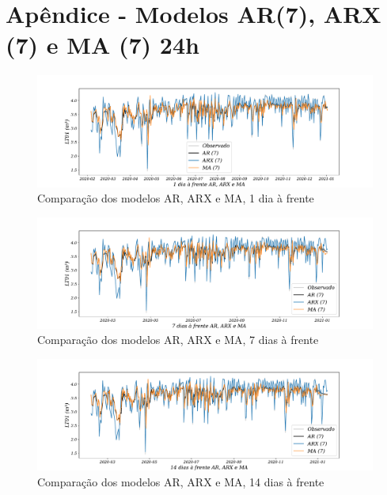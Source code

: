 
\section{Ap\^endice - Modelos AR(7), ARX (7) e MA (7) 24h }\label{sec:ararxma24}

\begin{figure}[H]
	\centering
	\caption{Comparação dos modelos AR, ARX e MA, 1 dia à frente }
	\label{fig:1-AR-ARX-MA24}
	\includegraphics[width=1\linewidth]{Apendices/Figuras/modelagem-24h/1-AR-ARX-MA}
	
\end{figure}

\begin{figure}[!htpb]
	\centering
	\caption{Comparação dos modelos AR, ARX e MA, 7 dias à frente }
	\label{fig:10-AR-ARX-MA24}
	\includegraphics[width=1\linewidth]{Apendices/Figuras/modelagem-24h/7-AR-ARX-MA}
	
\end{figure}


\begin{figure}[!htpb]
	\centering
	\caption{Comparação dos modelos AR, ARX e MA, 14 dias à frente }
	\label{fig:30-AR-ARX-MA24}
	\includegraphics[width=1\linewidth]{Apendices/Figuras/modelagem-24h/14-AR-ARX-MA}
	
\end{figure}

